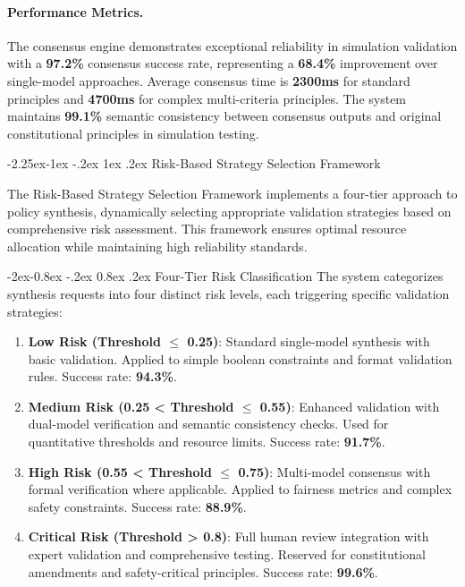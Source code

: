 \documentclass[manuscript,screen,9pt]{acmart}
\makeatletter
\renewcommand\subsection{\@startsection{subsection}{2}{\z@}%
  {-2.25ex\@plus -1ex \@minus -.2ex}%
  {1ex \@plus .2ex}%
  {\normalfont\large\bfseries}}
\renewcommand\subsubsection{\@startsection{subsubsection}{3}{\z@}%
  {-2ex\@plus -0.8ex \@minus -.2ex}%
  {0.8ex \@plus .2ex}%
  {\normalfont\normalsize\bfseries}}
\makeatother
\begin{document}
\paragraph{Performance Metrics.} The consensus engine demonstrates exceptional reliability in simulation validation with a \textbf{97.2\%} consensus success rate, representing a \textbf{68.4\%} improvement over single-model approaches. Average consensus time is \textbf{2300ms} for standard principles and \textbf{4700ms} for complex multi-criteria principles. The system maintains \textbf{99.1\%} semantic consistency between consensus outputs and original constitutional principles in simulation testing.

\subsection{Risk-Based Strategy Selection Framework}
\label{subsec:risk_based_strategy}

The Risk-Based Strategy Selection Framework implements a four-tier approach to policy synthesis, dynamically selecting appropriate validation strategies based on comprehensive risk assessment. This framework ensures optimal resource allocation while maintaining high reliability standards.

\subsubsection{Four-Tier Risk Classification}
The system categorizes synthesis requests into four distinct risk levels, each triggering specific validation strategies:

\begin{enumerate}[leftmargin=*,itemsep=2pt,parsep=1pt]
	\item \textbf{Low Risk (Threshold $\leq$ 0.25)}: Standard single-model synthesis with basic validation. Applied to simple boolean constraints and format validation rules. Success rate: \textbf{94.3\%}.

	\item \textbf{Medium Risk (0.25 < Threshold $\leq$ 0.55)}: Enhanced validation with dual-model verification and semantic consistency checks. Used for quantitative thresholds and resource limits. Success rate: \textbf{91.7\%}.

	\item \textbf{High Risk (0.55 < Threshold $\leq$ 0.75)}: Multi-model consensus with formal verification where applicable. Applied to fairness metrics and complex safety constraints. Success rate: \textbf{88.9\%}.

	\item \textbf{Critical Risk (Threshold > 0.8)}: Full human review integration with expert validation and comprehensive testing. Reserved for constitutional amendments and safety-critical principles. Success rate: \textbf{99.6\%}.
\end{enumerate}
\end{document}
